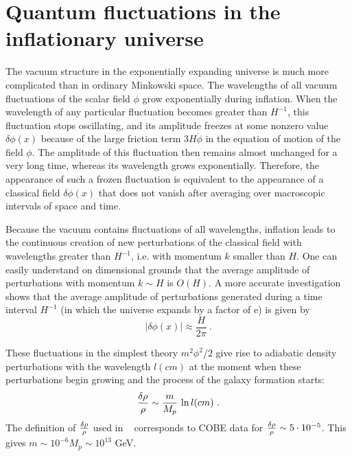 \documentclass[a4paper,12pt]{article}
\begin{document}
\section{\label{s7.3}Quantum fluctuations in the inflationary universe}

The vacuum structure in the  exponentially expanding universe  is much
more complicated than in ordinary Minkowski space.
 The wavelengths of all vacuum
fluctuations of the scalar field $\phi$ grow exponentially during
inflation. When the wavelength of any particular fluctuation becomes
greater than $H^{-1}$, this fluctuation stops oscillating, and its
amplitude freezes at some nonzero value $\delta\phi (x)$ because of the
large friction term $3H\dot{\phi}$ in the equation of motion of the field
$\phi$\@. The amplitude of this fluctuation then remains almost unchanged
for a very long time, whereas its wavelength grows exponentially.
Therefore, the appearance of such a frozen fluctuation is equivalent to
the appearance of a classical field $\delta\phi (x)$ that does not vanish
after averaging over macroscopic intervals of space and time.

Because the vacuum contains fluctuations of all wavelengths, inflation
leads to the continuous creation of  new perturbations of the classical
field with wavelengths greater than $H^{-1}$, i.e. with momentum $k$
smaller than $H$. One can easily understand  on dimensional grounds that the average amplitude of
 perturbations with momentum $k \sim H$ is $O(H)$. A more accurate
investigation shows that the average amplitude of perturbations generated during a time interval $H^{-1}$
(in which the universe expands by a factor of e) is given by~\cite{FordVil,book}
\begin{equation}\label{E23}
|\delta\phi(x)| \approx \frac{H}{2\pi}\ .
\end{equation}


These fluctuations in the simplest theory $m^2\phi^2/2$ give rise to adiabatic density perturbations with the wavelength
$l(cm)$ at the moment when these perturbations begin growing and the
process of the galaxy formation starts:
\begin{equation}\label{E26}
\frac{\delta \rho}{\rho} \sim   {m\over M_p}\,  \ln l(cm)\ .
\end{equation}
The definition of  ${\delta\rho\over \rho}$ used in  ~\cite{book}
corresponds to COBE data for  ${\delta\rho\over \rho} \sim 5\cdot
10^{-5}$. This gives $m \sim 10^{-6} M_p \sim 10^{13}$ GeV.
\end{document}

